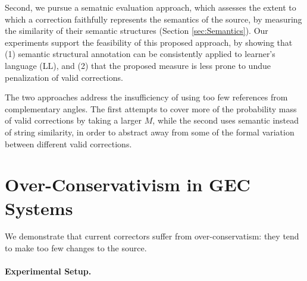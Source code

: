 \documentclass[letter,11pt]{article}
\begin{document}
Second, we pursue a sematnic evaluation approach, which assesses the extent to which
a correction faithfully represents the semantics of the source, by measuring the
similarity of their semantic structures (Section \ref{sec:Semantics}).
Our experiments support the feasibility of this proposed approach,
by showing that (1) semantic structural annotation can be consistently applied
to learner's language (LL), and (2) that the proposed measure is less prone to
undue penalization of valid corrections.

The two approaches address the insufficiency of using too few references from
complementary angles. The first attempts to cover more of the probability
mass of valid corrections by taking a larger $M$, 
while the second uses semantic instead of string similarity, in order
to abstract away from some of the formal variation between different valid corrections.


\section{Over-Conservativism in GEC Systems}\label{sec:formal_conservatism}



We demonstrate that current correctors
suffer from over-conservatism: they tend to make too few changes to the source. 


\paragraph{Experimental Setup.}\label{par:experimental_setup}
\end{document}
